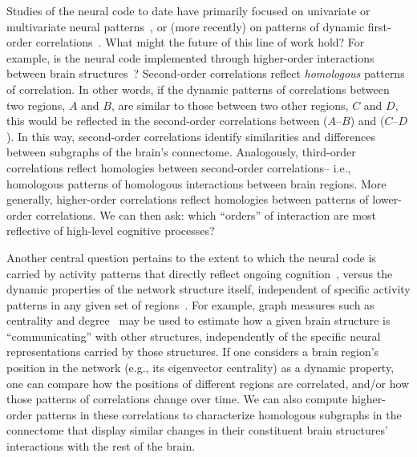 \documentclass[english]{article}
\begin{document}
Studies of the neural code to date have primarily focused on
univariate or multivariate neural patterns~\citep[for review
see][]{NormEtal06}, or (more recently) on patterns of dynamic
first-order correlations~\citep[i.e., interactions between pairs of
brain structures;][]{MannEtal18, FongEtal19, LuriEtal18, PretEtal17,
  ZouEtal19, DemeEtal19}.  What might the future of this line of work
hold?  For example, is the neural code implemented through
higher-order interactions between brain structures~\citep[e.g.,
see][]{ReimEtal17}?  Second-order correlations reflect
\textit{homologous} patterns of correlation.  In other words, if the
dynamic patterns of correlations between two regions, $A$ and $B$, are
similar to those between two other regions, $C$ and $D$, this would be
reflected in the second-order correlations between ($A$--$B$) and
($C$--$D$).  In this way, second-order correlations identify
similarities and differences between subgraphs of the brain's
connectome.  Analogously, third-order correlations reflect homologies
between second-order correlations-- i.e., homologous patterns of
homologous interactions between brain regions.  More generally,
higher-order correlations reflect homologies between patterns of
lower-order correlations.  We can then ask: which ``orders'' of
interaction are most reflective of high-level cognitive processes?

Another central question pertains to the extent to which the neural
code is carried by activity patterns that directly reflect ongoing
cognition~\citep[e.g., following][]{HaxbEtal01, NormEtal06}, versus
the dynamic properties of the network structure itself, independent of
specific activity patterns in any given set of regions~\citep[e.g.,
following][]{BassEtal06}.  For example, graph measures such as
centrality and degree~\citep{BullSpor09} may be used to estimate how a
given brain structure is ``communicating'' with other structures,
independently of the specific neural representations carried by those
structures.  If one considers a brain region's position in the network
(e.g., its eigenvector centrality) as a dynamic property, one can
compare how the positions of different regions are correlated, and/or
how those patterns of correlations change over time.  We can also
compute higher-order patterns in these correlations to characterize
homologous subgraphs in the connectome that display similar changes in
their constituent brain structures' interactions with the rest of the
brain.
\end{document}
